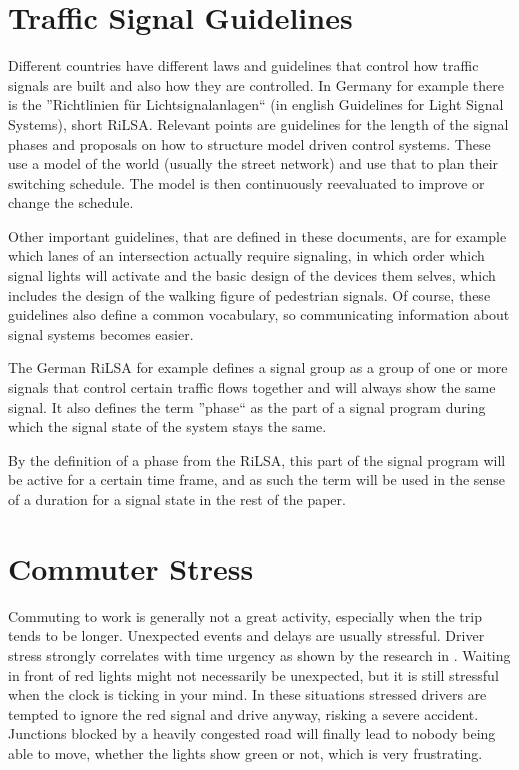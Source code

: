 \section{Traffic Signal Guidelines}

Different countries have different laws and guidelines that control how traffic signals are built and also how they are controlled.
In Germany for example there is the ''Richtlinien für Lichtsignalanlagen`` (in english Guidelines for Light Signal Systems), short RiLSA. Relevant points are guidelines for the length of the signal phases and proposals on how to structure model driven control systems. These use a model of the world (usually the street network) and use that to plan their switching schedule. The model is then continuously reevaluated to improve or change the schedule.

Other important guidelines, that are defined in these documents, are for example which lanes of an intersection actually require signaling, in which order which signal lights will activate and the basic design of the devices them selves, which includes the design of the walking figure of pedestrian signals. Of course, these guidelines also define a common vocabulary, so communicating information about signal systems becomes easier.

The German RiLSA for example defines a signal group as a group of one or more signals that control certain traffic flows together and will always show the same signal. It also defines the term ''phase`` as the part of a signal program during which the signal state of the system stays the same. \cite{rilsa}

By the definition of a phase from the RiLSA, this part of the signal program will be active for a certain time frame, and as such the term will be used in the sense of a duration for a signal state in the rest of the paper.

\section{Commuter Stress}
\label{commuter_stress}

Commuting to work is generally not a great activity, especially when the trip tends to be longer. Unexpected events and delays are usually stressful. Driver stress strongly correlates with time urgency as shown by the research in \cite{aggressive_behaviour}. Waiting in front of red lights might not necessarily be unexpected, but it is still stressful when the clock is ticking in your mind. In these situations stressed drivers are tempted to ignore the red signal and drive anyway, risking a severe accident. Junctions blocked by a heavily congested road will finally lead to nobody being able to move, whether the lights show green or not, which is very frustrating.

